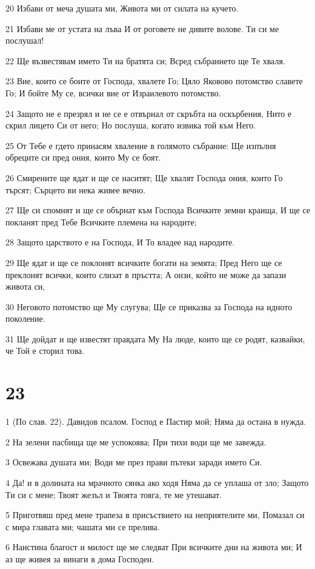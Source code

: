 \par 20 Избави от меча душата ми, Живота ми от силата на кучето.
\par 21 Избави ме от устата на лъва И от роговете не дивите волове. Ти си ме послушал!
\par 22 Ще възвестявам името Ти на братята си; Всред събранието ще Те хваля.
\par 23 Вие, които се боите от Господа, хвалете Го; Цяло Яковово потомство славете Го; И бойте Му се, всички вие от Израилевото потомство.
\par 24 Защото не е презрял и не се е отвърнал от скръбта на оскърбения, Нито е скрил лицето Си от него; Но послуша, когато извика той към Него.
\par 25 От Тебе е гдето принасям хваление в голямото събрание: Ще изпълня обреците си пред ония, които Му се боят.
\par 26 Смирените ще ядат и ще се наситят; Ще хвалят Господа ония, които Го търсят; Сърцето ви нека живее вечно.
\par 27 Ще си спомнят и ще се обърнат към Господа Всичките земни краища, И ще се покланят пред Тебе Всичките племена на народите;
\par 28 Защото царството е на Господа, И То владее над народите.
\par 29 Ще ядат и ще се поклонят всичките богати на земята; Пред Него ще се преклонят всички, които слизат в пръстта; А онзи, който не може да запази живота си,
\par 30 Неговото потомство ще Му слугува; Ще се приказва за Господа на идното поколение.
\par 31 Ще дойдат и ще известят правдата Му На люде, които ще се родят, казвайки, че Той е сторил това.

\chapter{23}

\par 1 (По слав. 22). Давидов псалом. Господ е Пастир мой; Няма да остана в нужда.
\par 2 На зелени пасбища ще ме успокоява; При тихи води ще ме завежда.
\par 3 Освежава душата ми; Води ме през прави пътеки заради името Си.
\par 4 Да! и в долината на мрачното сянка ако ходя Няма да се уплаша от зло; Защото Ти си с мене; Твоят жезъл и Твоята тояга, те ме утешават.
\par 5 Приготвяш пред мене трапеза в присъствието на неприятелите ми, Помазал си с мира главата ми; чашата ми се прелива.
\par 6 Наистина благост и милост ще ме следват При всичките дни на живота ми; И аз ще живея за винаги в дома Господен.

